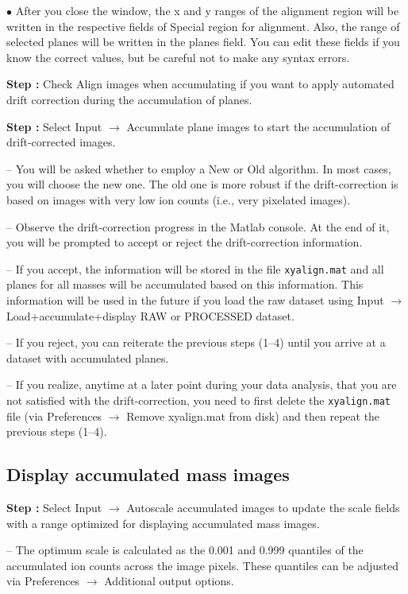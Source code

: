 \documentclass[a4paper, 11pt]{article}
\newcommand{\ttt}[1]{\texttt{#1}}
\newcommand{\lans}[1]{{\color{magenta}#1}}
\newcommand{\lanscb}[1]{{\color{darkgreen}#1}}
\newcommand{\lanstf}[1]{{\color{cyan}#1}}
\newcommand\ra{\rightarrow}
\newcommand\addon[1]{-- {\small #1}}
\newcounter{step}
\newcommand\s{\addtocounter{step}{1}\noindent\textbf{Step \thestep:}{ }}
\newcommand\bul{\noindent$\bullet${ }}
\begin{document}
\bul After you close the window, the x and y ranges of the alignment region will be written in the respective fields of \lanstf{Special region for alignment}. Also, the range of selected planes will be written in the \lanstf{planes} field. You can edit these fields if you know the correct values, but be careful not to make any syntax errors. 

\s Check \lanscb{Align images when accumulating} if you want to apply automated drift correction during the accumulation of planes.

\s Select \lans{Input} $\ra$ \lans{Accumulate plane images} to start the accumulation of drift-corrected images. 

\addon{You will be asked whether to employ a \lans{New} or \lans{Old} algorithm. In most cases, you will choose the new one. The old one is more robust if the drift-correction is based on images with very low ion counts (i.e., very pixelated images).}

\addon{Observe the drift-correction progress in the Matlab console. At the end of it, you will be prompted to accept or reject the drift-correction information.}

\addon{If you \lans{accept}, the information will be stored in the file \ttt{xyalign.mat} and all planes for all masses will be accumulated based on this information. This information will be used in the future if you load the raw dataset using \lans{Input} $\ra$ \lans{Load+accumulate+display RAW or PROCESSED dataset}.}

\addon{If you \lans{reject}, you can reiterate the previous steps (1--4) until you arrive at a dataset with accumulated planes.}

\addon{If you realize, anytime at a later point during your data analysis, that you are not satisfied with the drift-correction, you need to first delete the \ttt{xyalign.mat} file (via \lans{Preferences} $\ra$ \lans{Remove xyalign.mat from disk}) and then repeat the previous steps (1--4).}


\subsection{Display accumulated mass images}
\setcounter{step}{0}

\s Select \lans{Input} $\ra$ \lans{Autoscale accumulated images} to update the \lanstf{scale} fields with a range optimized for displaying accumulated mass images. 

\addon{The optimum scale is calculated as the 0.001 and 0.999 quantiles of the accumulated ion counts across the image pixels. These quantiles can be adjusted via \lans{Preferences} $\ra$ \lans{Additional output options}.}
\end{document}
